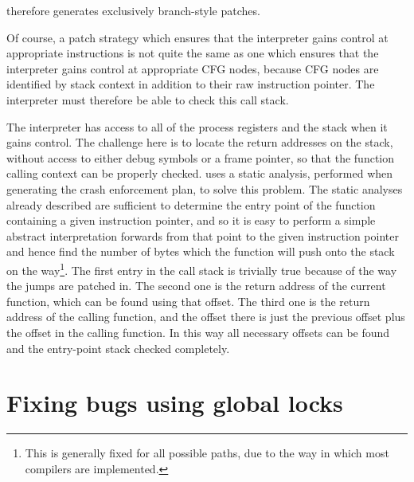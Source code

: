 {\Implementation} therefore generates exclusively branch-style patches.



Of course, a patch strategy which ensures that the interpreter gains
control at appropriate instructions is not quite the same as one which
ensures that the interpreter gains control at appropriate CFG nodes,
because {\technique} CFG nodes are identified by stack context in
addition to their raw instruction pointer.  The interpreter must
therefore be able to check this call stack.  

 The interpreter has
access to all of the process registers and the stack when it gains
control.  The challenge here is to locate the return addresses on the
stack, without access to either debug symbols or a frame pointer, so
that the function calling context can be properly checked.
{\Technique} uses a static analysis, performed when generating the
crash enforcement plan, to solve this problem.  The static analyses
already described are sufficient to determine the entry point of the
function containing a given instruction pointer, and so it is easy to
perform a simple abstract interpretation forwards from that point to
the given instruction pointer and hence find the number of bytes which
the function will push onto the stack on the way\footnote{This is
  generally fixed for all possible paths, due to the way in which most
  compilers are implemented.}.  The first entry in the call stack is
trivially true because of the way the jumps are patched in.  The
second one is the return address of the current function, which can be
found using that offset.  The third one is the return address of the
calling function, and the offset there is just the previous offset
plus the offset in the calling function.  In this way all necessary
offsets can be found and the entry-point stack checked completely.

\section{Fixing bugs using global locks}
\label{sect:fix_global_lock}

